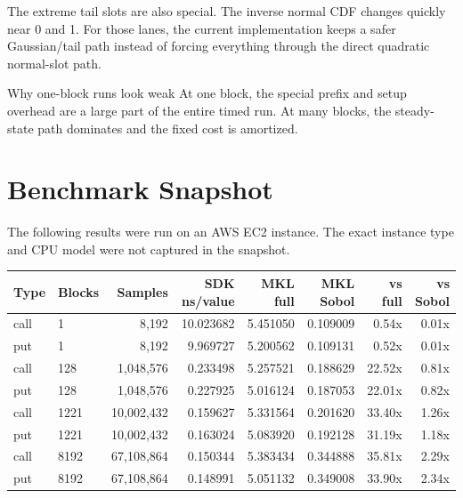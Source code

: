 \documentclass[11pt,a4paper]{article}
\begin{document}
The extreme tail slots are also special. The inverse normal CDF changes quickly
near 0 and 1. For those lanes, the current implementation keeps a safer
Gaussian/tail path instead of forcing everything through the direct quadratic
normal-slot path.

\begin{warnbox}{Why one-block runs look weak}
At one block, the special prefix and setup overhead are a large part of the
entire timed run. At many blocks, the steady-state path dominates and the fixed
cost is amortized.
\end{warnbox}

\section{Benchmark Snapshot}

The following results were run on an AWS EC2 instance. The exact instance type
and CPU model were not captured in the snapshot.

\begin{center}
\small
\begin{tabular}{llrrrrrr}
\toprule
Type & Blocks & Samples & SDK ns/value & MKL full & MKL Sobol & vs full & vs Sobol\\
\midrule
call & 1    & 8,192      & 10.023682 & 5.451050 & 0.109009 & 0.54x & 0.01x\\
put  & 1    & 8,192      &  9.969727 & 5.200562 & 0.109131 & 0.52x & 0.01x\\
call & 128  & 1,048,576  &  0.233498 & 5.257521 & 0.188629 & 22.52x & 0.81x\\
put  & 128  & 1,048,576  &  0.227925 & 5.016124 & 0.187053 & 22.01x & 0.82x\\
call & 1221 & 10,002,432 &  0.159627 & 5.331564 & 0.201620 & 33.40x & 1.26x\\
put  & 1221 & 10,002,432 &  0.163024 & 5.083920 & 0.192128 & 31.19x & 1.18x\\
call & 8192 & 67,108,864 &  0.150344 & 5.383434 & 0.344888 & 35.81x & 2.29x\\
put  & 8192 & 67,108,864 &  0.148991 & 5.051132 & 0.349008 & 33.90x & 2.34x\\
\bottomrule
\end{tabular}
\end{center}
\end{document}
